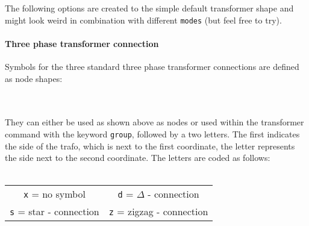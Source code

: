 \documentclass[a4]{article}
\begin{document}
\begin{examplebox}
\end{examplebox}
The following options are created to the simple default transformer shape and might look weird in combination with different \verb+modes+ (but feel free to try).
\paragraph{Three phase transformer connection}
Symbols for the three standard three phase transformer connections are defined as node shapes:\\[3pt]
\\ \ \\
They can either be used as shown above as nodes or used within the transformer command with the keyword \verb+group+, followed by a two letters. The first indicates the side of the trafo, which is next to the first coordinate, the letter represents the side next to the  second coordinate. The letters are coded as follows: \\ \ \\[-3mm]
\begin{center}
\begin{tabular}{cc}
\texttt{x} = no symbol\hspace{0.75cm} &
\texttt{d} = $\Delta$ - connection\hspace{0.75cm} \\
\texttt{s} = star - connection\hspace{0.75cm} &
\texttt{z} = zigzag - connection \\
\end{tabular}
\end{center}
\end{document}
